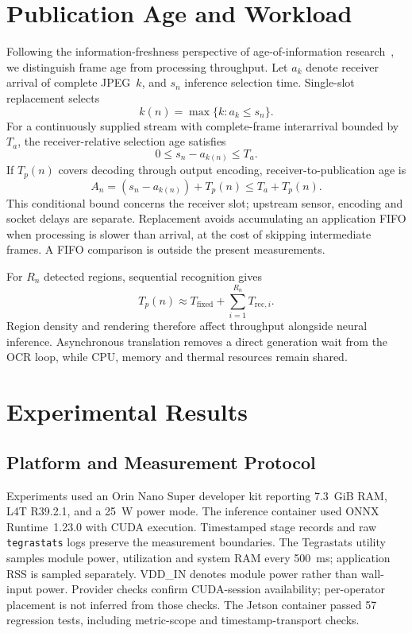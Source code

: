 \documentclass[cspaper,journal,10pt]{IEEEtran}
\begin{document}
\section{Publication Age and Workload}
Following the information-freshness perspective of age-of-information research~\cite{aoi}, we distinguish frame age from processing throughput. Let $a_k$ denote receiver arrival of complete JPEG~$k$, and $s_n$ inference selection time. Single-slot replacement selects
\begin{equation}
k(n)=\max\{k:a_k\leq s_n\}.
\end{equation}
For a continuously supplied stream with complete-frame interarrival bounded by $T_a$, the receiver-relative selection age satisfies
\begin{equation}
0\leq s_n-a_{k(n)}\leq T_a.
\end{equation}
If $T_p(n)$ covers decoding through output encoding, receiver-to-publication age is
\begin{equation}
A_n=(s_n-a_{k(n)})+T_p(n)\leq T_a+T_p(n).
\end{equation}
This conditional bound concerns the receiver slot; upstream sensor, encoding and socket delays are separate. Replacement avoids accumulating an application FIFO when processing is slower than arrival, at the cost of skipping intermediate frames. A FIFO comparison is outside the present measurements.

For $R_n$ detected regions, sequential recognition gives
\begin{equation}
T_p(n)\approx T_{\mathrm{fixed}}+\sum_{i=1}^{R_n}T_{\mathrm{rec},i}.
\end{equation}
Region density and rendering therefore affect throughput alongside neural inference. Asynchronous translation removes a direct generation wait from the OCR loop, while CPU, memory and thermal resources remain shared.

\section{Experimental Results}
\subsection{Platform and Measurement Protocol}
Experiments used an Orin Nano Super developer kit reporting 7.3~GiB RAM, L4T R39.2.1, and a 25~W power mode. The inference container used ONNX Runtime~1.23.0 with CUDA execution. Timestamped stage records and raw \texttt{tegrastats} logs preserve the measurement boundaries. The Tegrastats utility~\cite{tegrastats} samples module power, utilization and system RAM every 500~ms; application RSS is sampled separately. VDD\_IN denotes module power rather than wall-input power. Provider checks confirm CUDA-session availability; per-operator placement is not inferred from those checks. The Jetson container passed 57 regression tests, including metric-scope and timestamp-transport checks.
\end{document}
